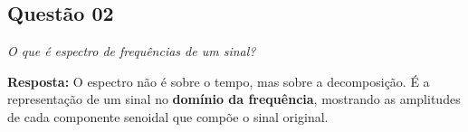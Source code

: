\subsection*{Questão 02}

\textit{O que é espectro de frequências de um sinal?}

\textbf{Resposta:}
O espectro não é sobre o tempo, mas sobre a decomposição.
É a representação de um sinal no \textbf{domínio da frequência},
mostrando as amplitudes de cada componente senoidal que compõe o sinal original.

\begin{center}
\end{center}